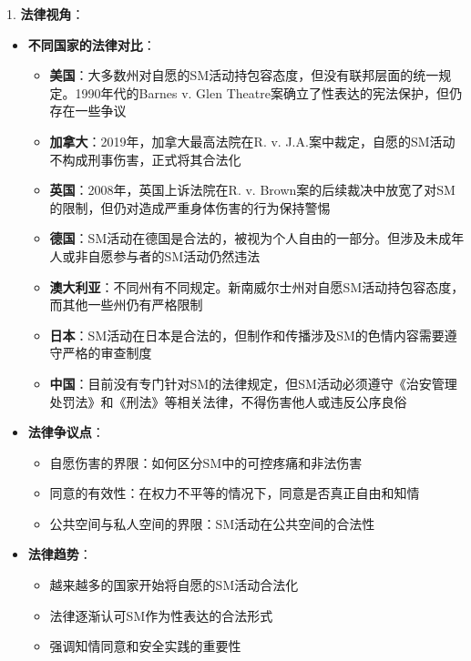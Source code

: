 \documentclass[12pt,UTF8]{ctexbook}
\begin{document}
1. \textbf{法律视角}：
  \begin{itemize}
  \item \textbf{不同国家的法律对比}：
    \begin{itemize}
    \item \textbf{美国}：大多数州对自愿的SM活动持包容态度，但没有联邦层面的统一规定。1990年代的Barnes v. Glen Theatre案确立了性表达的宪法保护，但仍存在一些争议
    \item \textbf{加拿大}：2019年，加拿大最高法院在R. v. J.A.案中裁定，自愿的SM活动不构成刑事伤害，正式将其合法化
    \item \textbf{英国}：2008年，英国上诉法院在R. v. Brown案的后续裁决中放宽了对SM的限制，但仍对造成严重身体伤害的行为保持警惕
    \item \textbf{德国}：SM活动在德国是合法的，被视为个人自由的一部分。但涉及未成年人或非自愿参与者的SM活动仍然违法
    \item \textbf{澳大利亚}：不同州有不同规定。新南威尔士州对自愿SM活动持包容态度，而其他一些州仍有严格限制
    \item \textbf{日本}：SM活动在日本是合法的，但制作和传播涉及SM的色情内容需要遵守严格的审查制度
    \item \textbf{中国}：目前没有专门针对SM的法律规定，但SM活动必须遵守《治安管理处罚法》和《刑法》等相关法律，不得伤害他人或违反公序良俗
    \end{itemize}
  \item \textbf{法律争议点}：
    \begin{itemize}
    \item 自愿伤害的界限：如何区分SM中的可控疼痛和非法伤害
    \item 同意的有效性：在权力不平等的情况下，同意是否真正自由和知情
    \item 公共空间与私人空间的界限：SM活动在公共空间的合法性
    \end{itemize}
  \item \textbf{法律趋势}：
    \begin{itemize}
    \item 越来越多的国家开始将自愿的SM活动合法化
    \item 法律逐渐认可SM作为性表达的合法形式
    \item 强调知情同意和安全实践的重要性
    \end{itemize}
  \end{itemize}
\end{document}
